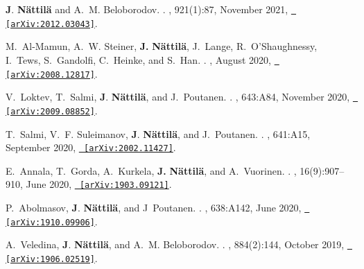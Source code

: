 \documentclass[letterpaper, onecolumn, 11pt]{article}
\begin{document}
\begin{thebibliography}{10}
\textbf{J}. \textbf{N{\"a}ttil{\"a}} and A.~M. {Beloborodov}.
.
\newblock {\em \apj}, 921(1):87, November 2021,
  \href{http://arxiv.org/abs/2012.03043}{\nolinkurl{ [arXiv:2012.03043]}}.

M.~{Al-Mamun}, A.~W. {Steiner}, \textbf{J.} \textbf{N{\"a}ttil{\"a}},
  J.~{Lange}, R.~{O'Shaughnessy}, I.~{Tews}, S.~{Gandolfi}, C.~{Heinke}, and
  S.~{Han}.
.
\newblock {\em \prl}, August 2020,
  \href{http://arxiv.org/abs/2008.12817}{\nolinkurl{ [arXiv:2008.12817]}}.

V.~{Loktev}, T.~{Salmi}, \textbf{J}. \textbf{N{\"a}ttil{\"a}}, and
  J.~{Poutanen}.
.
\newblock {\em \aap}, 643:A84, November 2020,
  \href{http://arxiv.org/abs/2009.08852}{\nolinkurl{ [arXiv:2009.08852]}}.

T.~{Salmi}, V.~F. {Suleimanov}, \textbf{J}. \textbf{N{\"a}ttil{\"a}}, and
  J.~{Poutanen}.
.
\newblock {\em \aap}, 641:A15, September 2020,
  \href{http://arxiv.org/abs/2002.11427}{\nolinkurl{ [arXiv:2002.11427]}}.

E.~{Annala}, T.~{Gorda}, A.~{Kurkela}, \textbf{J.} \textbf{{N{\"a}ttil{\"a}}},
  and A.~{Vuorinen}.
.
, 16(9):907--910, June 2020,
  \href{http://arxiv.org/abs/1903.09121}{\nolinkurl{ [arXiv:1903.09121]}}.

P.~{Abolmasov}, \textbf{J}. \textbf{N{\"a}ttil{\"a}}, and J~{Poutanen}.
.
\newblock {\em \aap}, 638:A142, June 2020,
  \href{http://arxiv.org/abs/1910.09906}{\nolinkurl{ [arXiv:1910.09906]}}.

A.~{Veledina}, \textbf{J}. \textbf{N{\"a}ttil{\"a}}, and A.~M. {Beloborodov}.
.
\newblock {\em \apj}, 884(2):144, October 2019,
  \href{http://arxiv.org/abs/1906.02519}{\nolinkurl{ [arXiv:1906.02519]}}.


\end{thebibliography}
\end{document}
